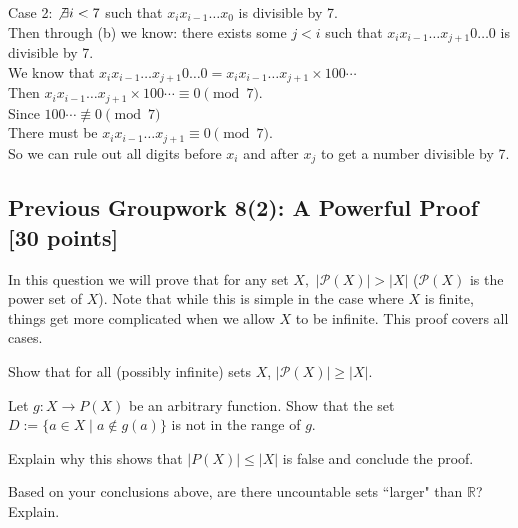 \documentclass[12pt]{exam}
\begin{document}
\begin{solution}
\begin{qparts}
        Case 2:
        $\not\exists i < 7$ such that $x_i x_{i-1} \dots x_0$ is divisible 
        by 7.\\
        Then through (b) we know: there exists some $j < i$ such that 
        $x_ix_{i-1}\dots x_{j+1} 0 \dots 0$ is divisible by 7.\\
        We know that $x_ix_{i-1}\dots x_{j+1} 0 \dots 0 = x_ix_{i-1}\dots x_{j+1} \times 100\cdots$\\
        Then $x_ix_{i-1}\dots x_{j+1} \times 100\cdots \equiv 0 \pmod{7}$.\\
        Since $100\cdots \not\equiv 0 \pmod{7}$\\
        There must be $x_ix_{i-1}\dots x_{j+1} \equiv 0 \pmod{7}$.\\
        So we can rule out all digits before $x_i$ and after $x_j$ to get a number divisible by 7.
    \end{qparts}
\end{solution}

\subsection*{Previous Groupwork 8(2): A Powerful Proof [30 points]}

In this question we will prove that for any set $X,$ $|\mathcal{P}(X)| > |X|$ ($\mathcal{P}(X)$ is the power set of $X$). Note that 
while this is simple in the case where $X$ is finite, things get more complicated when we allow $X$ to be infinite. This proof covers all cases.

\begin{qparts}
    \item Show that for all (possibly infinite) sets $X$, $|\mathcal{P}(X)| \ge |X|.$
    \item Let $g\colon X \to P(X)$ be an arbitrary function.
    Show that the set $D := \{a\in X \mid a\notin g(a)\}$ is not in the range of $g$.
    \item Explain why this shows that $|P(X)| \leq |X|$ is false and conclude the proof.    
    \item Based on your conclusions above, are there uncountable sets ``larger" than $\mathbb{R}$? Explain.
\end{qparts}
\end{document}
